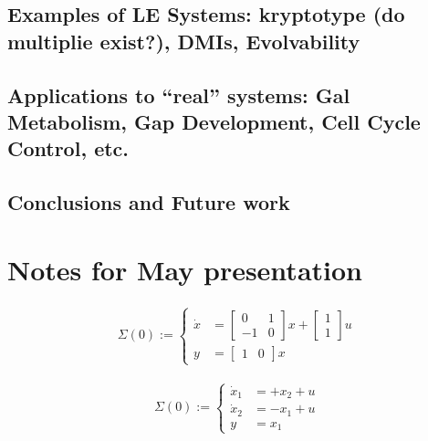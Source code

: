 \documentclass[11 pt]{article}
\newcommand{\1}{\mathbbm{1}}
\begin{document}
     \subsection{Examples of LE Systems: kryptotype (do multiplie exist?), DMIs, Evolvability}

     \subsection{Applications to ``real'' systems: Gal Metabolism, Gap Development, Cell Cycle Control, etc.}

     \subsection{Conclusions and Future work}

     \section{Notes for May presentation}
       \begin{align*}
         \Sigma(0) := \left\{ \begin{array}{ll}
         \dot{x} &= \left[ \begin{array}{cc} 0 & 1 \\ -1 & 0 \end{array} \right] x + \left[ \begin{array}{c} 1 \\ 1 \end{array}\right] u \\
           y &= \left[ \begin{array}{cc} 1 & 0 \end{array} \right] x
         \end{array} \right.
    \end{align*}

    \begin{align*}
      \Sigma(0) := \left\{ \begin{array}{ll}
      \dot{x}_{1} &= +x_{2} + u \\
      \dot{x}_{2} &= -x_{1} + u \\
      y &= x_{1}
      \end{array} \right.
    \end{align*}
\end{document}
